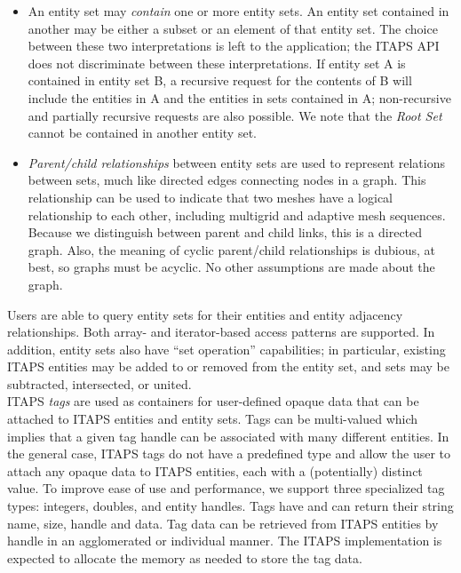 \documentclass{article}
\begin{document}
\begin{itemize}
\item
An entity set may \emph{contain} one or more entity sets. An entity 
set contained in another may be either a subset or an element 
of that entity set. The choice between these two interpretations 
is left to the application; the ITAPS API does not discriminate 
between these interpretations. If entity set A is contained in 
entity set B, a recursive request for the contents of B will include 
the entities in A and the entities in sets contained in A; non-recursive 
and partially recursive requests are also possible.  We note that 
the \emph{Root Set} cannot be contained in another entity set.


\item
\emph{Parent/child relationships} between entity sets are used to 
represent relations between sets, much like directed edges connecting 
nodes in a graph. This relationship can be used to indicate that 
two meshes have a logical relationship to each other, including 
multigrid and adaptive mesh sequences. Because we distinguish 
between parent and child links, this is a directed graph. Also, 
the meaning of cyclic parent/child relationships is dubious, 
at best, so graphs must be acyclic. No other assumptions are 
made about the graph.
\end{itemize}

Users are able to query entity sets for their entities and entity 
adjacency relationships. Both array- and iterator-based access 
patterns are supported. In addition, entity sets also have ``set
operation'' capabilities; in particular, existing ITAPS 
entities may be added to or removed from the entity set, and 
sets may be subtracted, intersected, or united. \\

ITAPS \emph{tags} are used as containers for user-defined opaque data 
that can be attached to ITAPS entities and entity sets. Tags can 
be multi-valued which implies that a given tag handle can be 
associated with many different entities. In the general case, 
ITAPS tags do not have a predefined type and allow the user to 
attach any opaque data to ITAPS entities, each with a (potentially) 
distinct value. To improve ease of use and performance, we support 
three specialized tag types: integers, doubles, and entity handles. 
Tags have and can return their string name, size, handle and 
data. Tag data can be retrieved from ITAPS entities by handle 
in an agglomerated or individual manner. The ITAPS implementation 
is expected to allocate the memory as needed to store the tag 
data.
\end{document}
